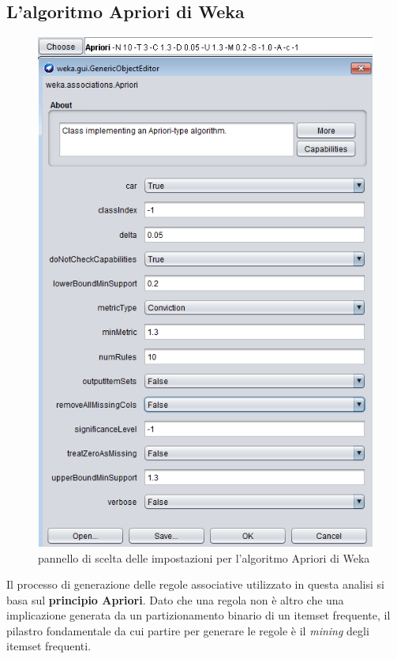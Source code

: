     \subsection{L'algoritmo Apriori di Weka}

    \begin{figure}
        \centering
        \caption{pannello di scelta delle impostazioni per l'algoritmo Apriori di Weka}
        \label{apriori_weka}
	    \includegraphics[scale=1.0]{img/apriori_weka.png}
    \end{figure}

        Il processo di generazione delle regole associative utilizzato in questa analisi si basa sul \textbf{principio Apriori}. Dato che una regola non è altro che una implicazione generata da un partizionamento binario di un itemset frequente, il pilastro fondamentale da cui partire per generare le regole è il \textit{mining} degli itemset frequenti. \\

